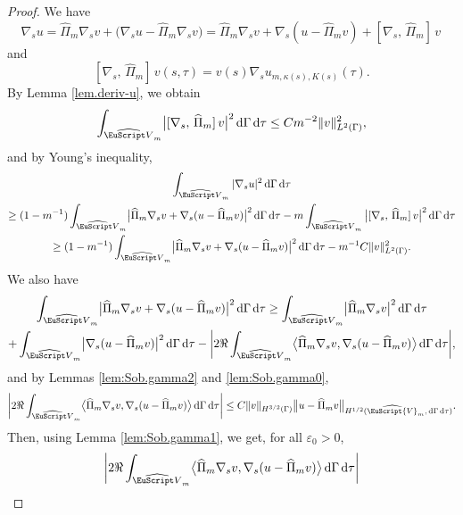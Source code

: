 \documentclass[10pt]{amsart}
\let\mathcal \EuScript
\newcommand{\cV}{\mathcal{V}}
\theoremstyle{plain}
\theoremstyle{definition}
\newcommand{\dx}{\mathrm{\,d}}
\begin{document}
\begin{proof}
We have
\[
\nabla_s u
= \widehat{\Pi}_m \nabla_s v + \bigl(\nabla_s u - \widehat{\Pi}_m \nabla_s v\bigr)
=
\widehat{\Pi}_m \nabla_s v + \nabla_s (u-\widehat{\Pi}_m v) +[ \nabla_s,\,\widehat{\Pi}_m ]\,v\,
\]
and
\[
[ \nabla_s,\,\widehat{\Pi}_m ]\,v(s,\tau) = v(s)\nabla_s u_{m,\kappa(s),K(s)}(\tau).
\]
By Lemma \ref{lem.deriv-u}, we obtain
\[
\int_{\widehat{\mathcal V}_{m}}\bigl|[ \nabla_s,\,\widehat{\Pi}_m ]\,v\bigr|^2\dx \Gamma \dx\tau \leq Cm^{-2}\|v\|^2_{L^2(\Gamma)},
\]
and by Young's inequality,
\begin{multline}\label{eq:lemboundext7}
\int_{\widehat{\mathcal V}_{m}}|\nabla_s u|^2 \dx \Gamma \dx\tau
\\\geq
(1-m^{-1})\int_{\widehat{\mathcal V}_{m}}\bigl|\widehat{\Pi}_m \nabla_s v + \nabla_s (u-\widehat{\Pi}_m v)\bigl|^2 \dx \Gamma \dx\tau
-m
\int_{\widehat{\mathcal V}_{m}}\big|[ \nabla_s,\,\widehat{\Pi}_m ]\,v\big|^2 \dx \Gamma \dx\tau
\\\geq
(1-m^{-1})\int_{\widehat{\mathcal V}_{m}}\bigl|\widehat{\Pi}_m \nabla_s v + \nabla_s (u-\widehat{\Pi}_m v)\bigr|^2 \dx \Gamma \dx\tau
-m^{-1}C\|v\|^2_{L^2(\Gamma)}.
\end{multline}
We also have
\begin{multline}\label{eq:lemboundext2}
\int_{\widehat{\mathcal V}_{m}}\bigl|\widehat{\Pi}_m \nabla_s v + \nabla_s (u-\widehat{\Pi}_m v)\bigr|^2 \dx \Gamma \dx\tau
\geq
\int_{\widehat{\mathcal V}_{m}}\bigl|\widehat{\Pi}_m \nabla_s v \bigr|^2 \dx \Gamma \dx\tau
\\
+
\int_{\widehat{\mathcal V}_{m}}\bigl|\nabla_s (u-\widehat{\Pi}_m v)\bigr|^2 \dx \Gamma \dx\tau
-
\biggl|2\Re
\int_{\widehat{\mathcal V}_{m}}\bigl\langle\widehat{\Pi}_m \nabla_s v, \nabla_s (u-\widehat{\Pi}_m v)\bigr\rangle \dx \Gamma \dx\tau\biggr|,
\end{multline}
and
by Lemmas \ref{lem:Sob.gamma2} and \ref{lem:Sob.gamma0},
\begin{equation*}
\biggl|2\Re
\int_{\widehat{\mathcal V}_{m}}\bigl\langle\widehat{\Pi}_m \nabla_s v, \nabla_s (u-\widehat{\Pi}_m v)\bigr\rangle \dx \Gamma \dx\tau\biggr|
\leq C
\|v\|_{H^{3/2}(\Gamma)}
\bigl\|u - \widehat{\Pi}_mv\bigr\|_{H^{1/2}(\widehat{\cV}_m, \dx\Gamma\dx\tau)}.
\end{equation*}
Then, using Lemma \ref{lem:Sob.gamma1}, we get, for all $\varepsilon_0>0$,
\begin{equation}\label{eq:lemboundext3}
\begin{split}
\biggl|2\Re
\int_{\widehat{\mathcal V}_{m}}\bigl\langle&\widehat{\Pi}_m \nabla_s v, \nabla_s (u-\widehat{\Pi}_m v)\bigr\rangle \dx \Gamma \dx\tau\biggr|\\

\end{split}
\end{equation}
\end{proof}
\end{document}
